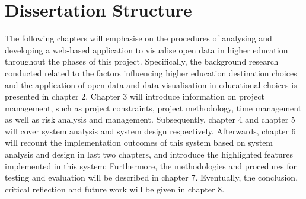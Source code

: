 \section{Dissertation Structure
}
The following chapters will emphasise on the procedures of analysing and developing a web-based application to visualise open data in higher education throughout the phases of this project. Specifically, the background research conducted related to the factors influencing higher education destination choices and the application of open data and data visualisation in educational choices is presented in chapter 2. Chapter 3 will introduce information on project management, such as project constraints, project methodology, time management as well as risk analysis and management. Subsequently, chapter 4 and chapter 5 will cover system analysis and system design respectively. Afterwards, chapter 6 will recount the implementation outcomes of this system based on system analysis and design in last two chapters, and introduce the highlighted features implemented in this system; Furthermore, the methodologies and procedures for testing and evaluation will be described in chapter 7. Eventually, the conclusion, critical reflection and future work will be given in chapter 8.

